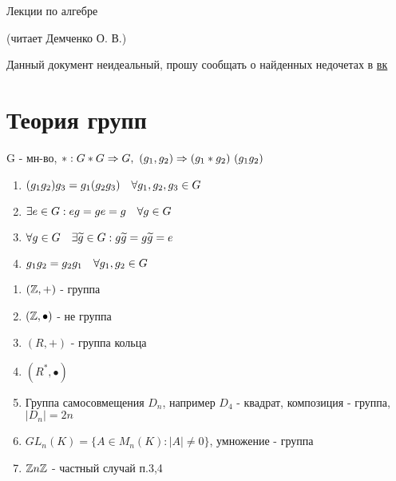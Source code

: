 \documentclass[11pt]{article}
\begin{document}
\begin{center}
  \huge Лекции по алгебре
  
  (читает Демченко О. В.)
\end{center}
Данный документ неидеальный, прошу сообщать о найденных недочетах в \href{https://vk.com/drab_existence_a}{вк}
\tableofcontents
\newpage

\section{Теория групп}

\begin{definition}
    G - мн-во, $*:G*G \Rightarrow G,\ (g_1, g_2) \Rightarrow (g_1*g_2)\ (g_1g_2)$
    \begin{enumerate}                               
    	\item $(g_1g_2)g_3 = g_1(g_2g_3) \quad \forall g_1, g_2, g_3 \in G$
    	\item $\exists e \in G : eg = ge = g \quad \forall g \in G$
    	\item $\forall g \in G \quad \exists \widetilde{g} \in G : g\widetilde{g} = g \widetilde{g} = e$
    	\item $g_1g_2 = g_2g_1 \quad \forall g_1, g_2 \in G$
	\end{enumerate} 
\end{definition}

\begin{instances}
    \begin{enumerate}  
        \item $(\mathbb{Z},+)$ - группа
        \item $(\mathbb{Z}, \bullet)$ - не группа
        \item $(R, +)$ - группа кольца
        \item $(R^*, \bullet)$
        \item Группа самосовмещения $D_n$, например $D_4$ - квадрат, композиция - группа, $|D_n|=2n$
        \item $GL_n(K) = \{A \in M_n(K) : |A| \neq 0\}$, умножение - группа
        \item $\mathbb{Z} n \mathbb{Z}$ - частный случай п.3,4
    \end{enumerate} 
\end{instances}
\end{document}
